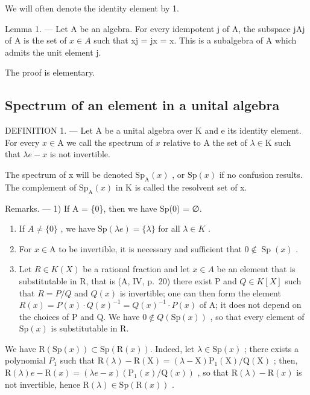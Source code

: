 We will often denote the identity element by 1.

Lemma 1. --- Let A be an algebra. For every idempotent j of A, the subspace jAj of A is the set of \(x \in A\) such that xj = jx = x. This is a subalgebra of A which admits the unit element j.

The proof is elementary.

\subsection{Spectrum of an element in a unital algebra}

DEFINITION 1. --- Let A be a unital algebra over K and e its identity element. For every \(x \in \mathrm{A}\) we call the spectrum of \(x\) relative to A the set of \(\lambda \in \mathrm{K}\) such that \(\lambda e - x\) is not invertible.

The spectrum of x will be denoted \(\mathrm{Sp}_{\mathrm{A}}(x)\) , or \(\mathrm{Sp}(x)\) if no confusion results. The complement of \(\mathrm{Sp}_{\mathrm{A}}(x)\) in K is called the resolvent set of x.

Remarks. --- 1) If A = \{0\}, then we have Sp(0) = ∅.

\begin{enumerate}
\def\labelenumi{\arabic{enumi})}
\setcounter{enumi}{1}
\item
  If \(A \neq \{0\}\) , we have \(\mathrm{Sp}(\lambda e) = \{\lambda\}\) for all \(\lambda \in K\) .
\item
  For \(x \in \mathrm{A}\) to be invertible, it is necessary and sufficient that \(0 \notin \operatorname{Sp}(x)\) .
\item
  Let \(R \in K(X)\) be a rational fraction and let \(x \in A\) be an element that is substitutable in R, that is (A, IV, p.~20) there exist P and \(Q \in K[X]\) such that \(R = P/Q\) and \(Q(x)\) is invertible; one can then form the element \(R(x) = P(x) \cdot Q(x)^{-1} = Q(x)^{-1} \cdot P(x)\) of A; it does not depend on the choices of P and Q. We have \(0 \notin Q(\mathrm{Sp}(x))\) , so that every element of \(\mathrm{Sp}(x)\) is substitutable in R.
\end{enumerate}

We have \(\mathrm{R}(\mathrm{Sp}(x)) \subset \mathrm{Sp}(\mathrm{R}(x))\). Indeed, let \(\lambda \in \mathrm{Sp}(x)\) ; there exists a polynomial \(P_{1}\) such that \(\mathrm{R}(\lambda) - \mathrm{R}(\mathrm{X}) = (\lambda - \mathrm{X})\mathrm{P}_{1}(\mathrm{X}) / \mathrm{Q}(\mathrm{X})\) ; then, \(\mathrm{R}(\lambda)e - \mathrm{R}(x) = (\lambda e - x)(\mathrm{P}_{1}(x)/\mathrm{Q}(x))\) , so that \(\mathrm{R}(\lambda) - \mathrm{R}(x)\) is not invertible, hence \(\mathrm{R}(\lambda) \in \mathrm{Sp}(\mathrm{R}(x))\) .

